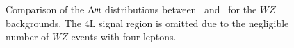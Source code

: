 \begin{itemize}
\begin{figure}[h]
{			
		}
		\caption{Comparison of the $\Delta m$ distributions between \powheg\ and \sherpa\ for the $WZ$ backgrounds. The 4L signal region is omitted due to the negligible number of $WZ$ events with four leptons.}
		\label{fig:systematic-WZ-shape}
	\end{figure}


\end{itemize}
